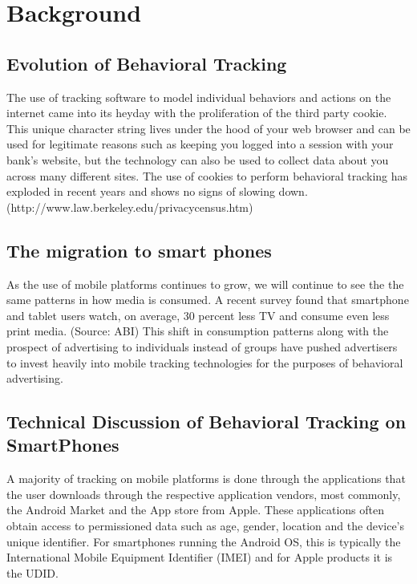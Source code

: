 \section{Background}

	\subsection{Evolution of Behavioral Tracking}
The use of tracking software to model individual behaviors and actions on the internet came into its heyday with the proliferation of the third party cookie. This unique character string lives under the hood of your web browser and can be used for legitimate reasons such as keeping you logged into a session with your bank’s website, but the technology can also be used to collect data about you across many different sites. The use of cookies to perform behavioral tracking has exploded in recent years and shows no signs of slowing down\cite{Thru2010}.  (http://www.law.berkeley.edu/privacycensus.htm)

	\subsection{The migration to smart phones}

As the use of mobile platforms continues to grow, we will continue to see the the same patterns in how media is consumed. A recent survey found that smartphone and tablet users watch, on average, 30 percent less TV and consume even less print media. (Source: ABI) This shift in consumption patterns along with the prospect of advertising to individuals instead of groups have pushed advertisers to invest heavily into mobile tracking technologies for the purposes of behavioral advertising.

   

	\subsection{Technical Discussion of Behavioral Tracking on SmartPhones}

A majority of tracking on mobile platforms is done through the applications that the user downloads through the respective application vendors, most commonly, the Android Market and the App store from Apple. These applications often obtain access to permissioned data such as age, gender, location and the device’s unique identifier. For smartphones running the Android OS, this is typically the International Mobile Equipment Identifier (IMEI) and for Apple products it is the UDID.

